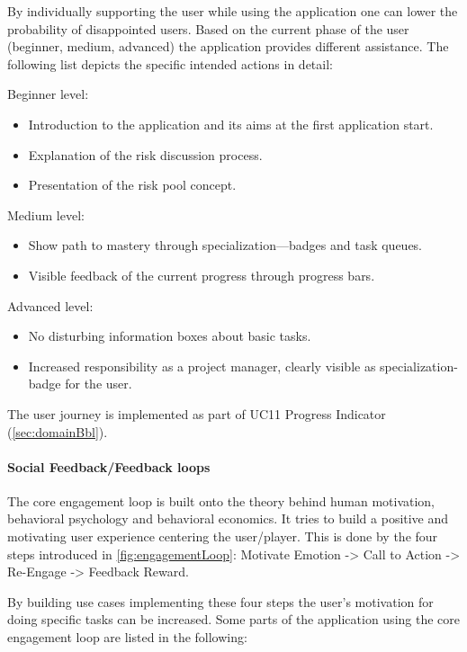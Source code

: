 By individually supporting the user while using the application one can lower the probability of disappointed users. Based on the current phase of the user (beginner, medium, advanced) the application provides different assistance. The following list depicts the specific intended actions in detail:

\noindent
Beginner level:
\begin{itemize}
	\item Introduction to the application and its aims at the first application start.
	\item Explanation of the risk discussion process.
	\item Presentation of the risk pool concept.
\end{itemize}

\noindent
Medium level:
\begin{itemize}
	\item Show path to mastery through specialization—badges and task queues.
	\item Visible feedback of the current progress through progress bars.
\end{itemize}

\noindent
Advanced level:
\begin{itemize}
	\item No disturbing information boxes about basic tasks.
	\item Increased responsibility as a project manager, clearly visible as specialization-badge for the user.
\end{itemize}

\noindent
The user journey is implemented as part of \ac{UC}11 Progress Indicator (\ref{sec:domainBbl}).

\paragraph*{Social Feedback/Feedback loops}

The core engagement loop is built onto the theory behind human motivation, behavioral psychology and behavioral economics. It tries to build a positive and motivating user experience centering the user/player. This is done by the four steps introduced in \ref{fig:engagementLoop}: Motivate Emotion -> Call to Action -> Re-Engage -> Feedback Reward. 

By building use cases implementing these four steps the user's motivation for doing specific tasks can be increased. Some parts of the application using the core engagement loop are listed in the following:

